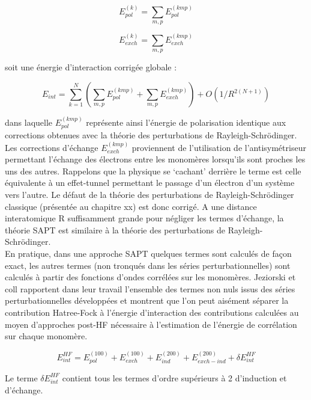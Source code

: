 	\begin{equation}
	E_{pol}^{(k)} = \sum_{m,p} E_{pol}^{(kmp)}
	\end{equation}
	
	\begin{equation}
	E_{exch}^{(k)} = \sum_{m,p} E_{exch}^{(kmp)}
	\end{equation}
	
	soit une énergie d’interaction corrigée globale :
	
	\begin{equation}
	E_{int} = \sum_{k=1}^{N} ( \sum_{m,p} E_{pol}^{(kmp)} + \sum_{m,p} E_{exch}^{(kmp)} ) + O(1/R^{2 (N+1)})
	\end{equation}
	
	dans laquelle $E_{pol}^{(kmp)}$ représente ainsi l'énergie de polarisation identique aux corrections obtenues avec la théorie des perturbations de Rayleigh-Schr\"{o}dinger. Les corrections d'échange $E_{exch}^{(kmp)}$ proviennent de l'utilisation de l'antisymétriseur permettant l'échange des électrons entre les monomères lorsqu'ils sont proches les uns des autres. Rappelons que la physique se ‘cachant’ derrière le terme est celle équivalente à un effet-tunnel permettant le passage d’un électron d’un système vers l’autre. Le défaut de la théorie des perturbations de Rayleigh-Schr\"{o}dinger classique (présentée au chapitre xx) est donc corrigé. A une distance interatomique R suffisamment grande pour négliger les termes d'échange, la théorie SAPT est similaire à la théorie des perturbations de Rayleigh-Schr\"{o}dinger.\\
	
	En pratique, dans une approche SAPT quelques termes sont calculés de façon exact, les autres termes (non tronqués dans les séries perturbationnelles) sont calculés à partir des fonctions d’ondes corrélées sur les monomères. Jeziorski et coll rapportent dans leur travail l’ensemble des termes non nuls issus des séries perturbationnelles développées et montrent que l’on peut aisément séparer la contribution Hatree-Fock à l’énergie d’interaction des contributions calculées au moyen d’approches post-HF nécessaire à l’estimation de l’énergie de corrélation sur chaque monomère. 
	
	\begin{equation}
	E_{int}^{HF} =  E_{pol}^{(100)} + E_{exch}^{(100)} + E_{ind}^{(200)} + E_{exch-ind}^{(200)} + \delta E_{int}^{HF}
	\end{equation}
	
	Le terme $\delta E_{int}^{HF}$ contient tous les termes d’ordre supérieurs à 2 d’induction et d’échange.
	
